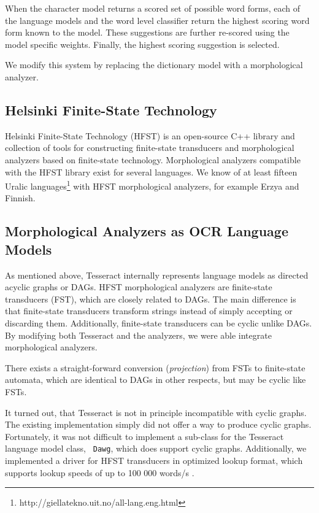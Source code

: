 \documentclass[b5paper]{article}
\begin{document}
When the character model returns a scored set of possible word forms,
each of the language models and the word level classifier return the
highest scoring word form known to the model. These suggestions are
further re-scored using the model specific weights. Finally, the highest
scoring suggestion is selected.

We modify this system by replacing the dictionary model with a
morphological analyzer.

\subsection{Helsinki Finite-State Technology}
Helsinki Finite-State Technology (HFST) \cite{linden13} is an
open-source C++ library and collection of tools for constructing
finite-state transducers and morphological analyzers based on
finite-state technology. Morphological analyzers compatible with the
HFST library exist for several languages. We know of at least fifteen
Uralic languages\footnote{http://giellatekno.uit.no/all-lang.eng.html}
with HFST morphological analyzers, for example Erzya and Finnish.

\subsection{Morphological Analyzers as OCR Language Models}
As mentioned above, Tesseract internally represents language models as
directed acyclic graphs or DAGs. HFST morphological analyzers are
finite-state transducers (FST), which are closely related to DAGs. The
main difference is that finite-state transducers transform strings
instead of simply accepting or discarding them. Additionally,
finite-state transducers can be cyclic unlike DAGs. By modifying both
Tesseract and the analyzers, we were able integrate morphological
analyzers.

There exists a straight-forward conversion ({\it projection})
from FSTs to finite-state automata, which are identical to DAGs in
other respects, but may be cyclic like FSTs. 

It turned out, that Tesseract is not in principle incompatible with
cyclic graphs. The existing implementation simply did not offer a way
to produce cyclic graphs. Fortunately, it was not difficult to
implement a sub-class for the Tesseract language model class, {\tt
  Dawg}, which does support cyclic graphs. Additionally, we implemented a
driver for HFST transducers in optimized lookup format, which supports
lookup speeds of up to 100 000 words/s \cite{silfverberg09}.
\end{document}
